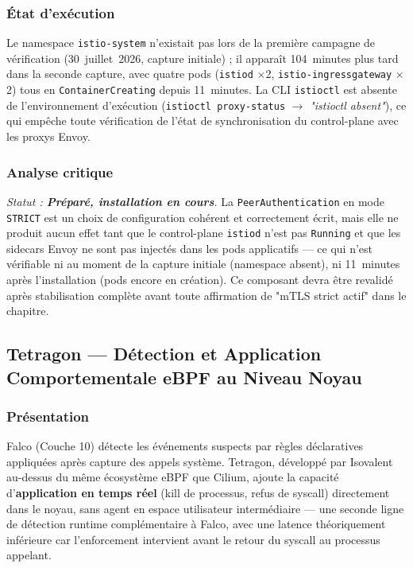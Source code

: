 \subsubsection{État d'exécution}
Le namespace \texttt{istio-system} n'existait pas lors de la première campagne de vérification (30~juillet~2026, capture initiale) ; il apparaît 104~minutes plus tard dans la seconde capture, avec quatre pods (\texttt{istiod} $\times$2, \texttt{istio-ingressgateway} $\times$2) tous en \texttt{ContainerCreating} depuis 11~minutes. La CLI \texttt{istioctl} est absente de l'environnement d'exécution (\texttt{istioctl proxy-status} $\rightarrow$ \textit{"istioctl absent"}), ce qui empêche toute vérification de l'état de synchronisation du control-plane avec les proxys Envoy.

\subsubsection{Analyse critique}
\textit{Statut : \textbf{Préparé, installation en cours}.} La \texttt{PeerAuthentication} en mode \texttt{STRICT} est un choix de configuration cohérent et correctement écrit, mais elle ne produit aucun effet tant que le control-plane \texttt{istiod} n'est pas \texttt{Running} et que les sidecars Envoy ne sont pas injectés dans les pods applicatifs — ce qui n'est vérifiable ni au moment de la capture initiale (namespace absent), ni 11~minutes après l'installation (pods encore en création). Ce composant devra être revalidé après stabilisation complète avant toute affirmation de "mTLS strict actif" dans le chapitre.

\subsection{Tetragon — Détection et Application Comportementale eBPF au Niveau Noyau}
\label{subsec:tetragon_complet_v2}

\subsubsection{Présentation}
Falco (Couche 10) détecte les événements suspects par règles déclaratives appliquées après capture des appels système. Tetragon, développé par Isovalent au-dessus du même écosystème eBPF que Cilium, ajoute la capacité d'\textbf{application en temps réel} (kill de processus, refus de syscall) directement dans le noyau, sans agent en espace utilisateur intermédiaire — une seconde ligne de détection runtime complémentaire à Falco, avec une latence théoriquement inférieure car l'enforcement intervient avant le retour du syscall au processus appelant.

